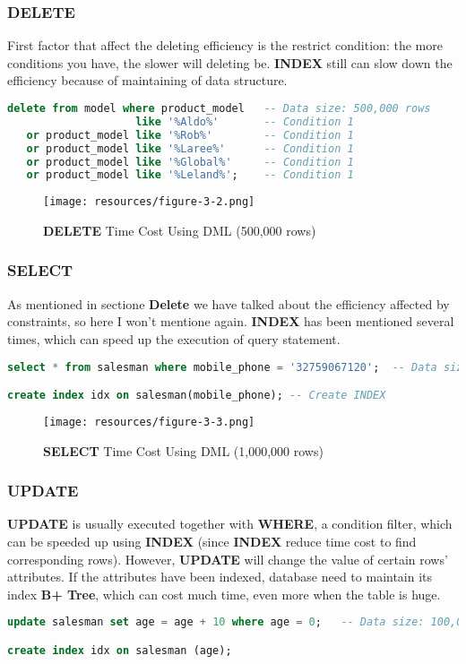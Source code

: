 \documentclass[onecolumn, oneside, ctexart, UTF8, b4paper]{SUSTechHomework}
\begin{document}
\subsubsection{\textbf{DELETE}}
First factor that affect the deleting efficiency is the restrict condition: the more conditions you have, the slower will deleting be. \textbf{INDEX} still can slow down the efficiency because of maintaining of data structure.

\begin{lstlisting}[language=SQL]
delete from model where product_model   -- Data size: 500,000 rows
                    like '%Aldo%'       -- Condition 1
   or product_model like '%Rob%'        -- Condition 1
   or product_model like '%Laree%'      -- Condition 1
   or product_model like '%Global%'     -- Condition 1
   or product_model like '%Leland%';    -- Condition 1
\end{lstlisting}

\begin{figure}[htbp]
    \centering
    \texttt{[image: resources/figure-3-2.png]}
    \caption{\textbf{DELETE} Time Cost Using DML (500,000 rows)}
    \label{fig3}
\end{figure}

\subsubsection{\textbf{SELECT}}
As mentioned in sectione \textbf{Delete} we have talked about the efficiency affected by constraints, so here I won't mentione again. \textbf{INDEX} has been mentioned several times, which can speed up the execution of query statement.

\begin{lstlisting}[language=SQL]
select * from salesman where mobile_phone = '32759067120';  -- Data size: 1,000,000 rows

create index idx on salesman(mobile_phone); -- Create INDEX
\end{lstlisting}


\begin{figure}[H]
    \centering
    \texttt{[image: resources/figure-3-3.png]}
    \caption{\textbf{SELECT} Time Cost Using DML (1,000,000 rows)}
    \label{fig4}
\end{figure}

\subsubsection{\textbf{UPDATE}}
\textbf{UPDATE} is usually executed together with \textbf{WHERE}, a condition filter, which can be speeded up using \textbf{INDEX} (since \textbf{INDEX} reduce time cost to find corresponding rows). However, \textbf{UPDATE} will change the value of certain rows' attributes. If the attributes have been indexed, database need to maintain its index \textbf{B+ Tree}, which can cost much time, even more when the table is huge.
\begin{lstlisting}[language=SQL]
update salesman set age = age + 10 where age = 0;   -- Data size: 100,000 rows

create index idx on salesman (age);
\end{lstlisting}
\end{document}
